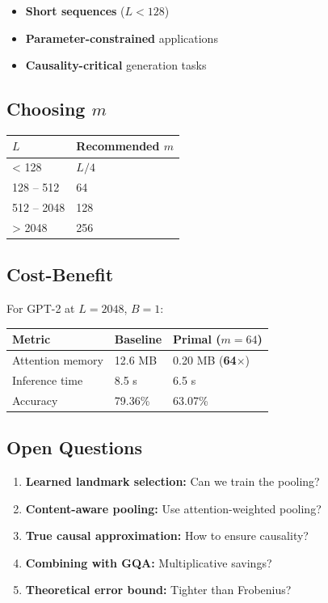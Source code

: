 \begin{itemize}
\item \textbf{Short sequences} ($L < 128$)
\item \textbf{Parameter-constrained} applications
\item \textbf{Causality-critical} generation tasks

\end{itemize}
\subsection{Choosing $m$}

\begin{table}[H]
\centering
\small
\begin{tabular}{ll}
\toprule
\textbf{$L$} & \textbf{Recommended $m$} \\
\midrule
\textless{} 128 & $L / 4$ \\
128 -- 512 & 64 \\
512 -- 2048 & 128 \\
\textgreater{} 2048 & 256 \\
\bottomrule
\end{tabular}
\end{table}

\subsection{Cost-Benefit}

For GPT-2 at $L = 2048$, $B = 1$:

\begin{table}[H]
\centering
\small
\begin{tabular}{lll}
\toprule
\textbf{Metric} & \textbf{Baseline} & \textbf{Primal ($m=64$)} \\
\midrule
Attention memory & 12.6 MB & 0.20 MB (\textbf{64$\times$}) \\
Inference time & 8.5 s & 6.5 s \\
Accuracy & 79.36\% & 63.07\% \\
\bottomrule
\end{tabular}
\end{table}

\subsection{Open Questions}

\begin{enumerate}
\item \textbf{Learned landmark selection:} Can we train the pooling?
\item \textbf{Content-aware pooling:} Use attention-weighted pooling?
\item \textbf{True causal approximation:} How to ensure causality?
\item \textbf{Combining with GQA:} Multiplicative savings?
\item \textbf{Theoretical error bound:} Tighter than Frobenius?

\end{enumerate}
